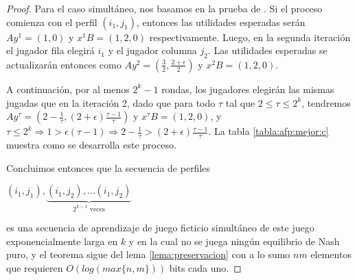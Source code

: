 \begin{proof}
    Para el caso simultáneo, nos basamos en la prueba de \cite{brandt:rate:convergence}. Si el proceso comienza con el perfil $(i_1, j_1)$, entonces las utilidades esperadas serán $Ay^1 = (1, 0)$ y $x^1 B = (1, 2, 0)$ respectivamente. Luego, en la segunda iteración el jugador fila elegirá $i_1$ y el jugador columna $j_2$. Las utilidades esperadas se actualizarán entonces como $Ay^2 = (\frac{3}{2}, \frac{2 + \epsilon}{2})$ y $x^2 B = (1, 2, 0)$.

    A continuación, por al menos $2^{k}-1$ rondas, los jugadores elegirán las mismas jugadas que en la iteración 2, dado que para todo $\tau$ tal que $2 \le \tau \le 2^k$, tendremos $Ay^\tau = (2 - \frac{1}{\tau}, (2 + \epsilon)\frac{\tau-1}{\tau})$ y $x^\tau B = (1, 2, 0)$, y $\tau \le 2^k \Rightarrow 1 > \epsilon (\tau-1) \Rightarrow 2 - \frac{1}{\tau} > (2 + \epsilon)\frac{\tau-1}{\tau}$. La tabla \ref{tabla:afp:mejor:c} muestra como se desarrolla este proceso.

    Concluimos entonces que la secuencia de perfiles

    \begin{center}
    \begin{math}
        (i_1, j_1), \underbrace{(i_1, j_2), ... (i_1, j_2)}_{\text{$2^{k-1}$ veces}}
    \end{math}
    \end{center}


    es una secuencia de aprendizaje de juego ficticio simultáneo de este juego exponencialmente larga en $k$ y en la cual no se juega ningún equilibrio de Nash puro, y el teorema sigue del lema \ref{lema:preservacion} con a lo sumo $nm$ elementos que requieren $O(log(max\{n,m\}))$ bits cada uno.

\end{proof}